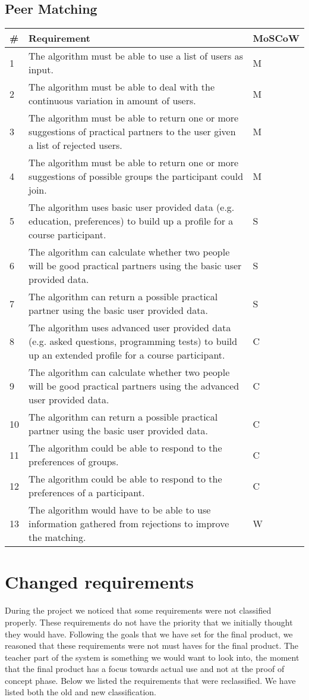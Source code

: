 \subsection{Peer Matching}
\begin{tabular}{ | p{0.5cm} | p{12cm} | p{2cm} | }
\hline
\textbf{\#} & \textbf{Requirement} & \textbf{MoSCoW} \\ \hline
1 & The algorithm must be able to use a list of users as input. & M \\ \hline
2 & The algorithm must be able to deal with the continuous variation in amount of users. & M \\ \hline
3 & The algorithm must be able to return one or more suggestions of practical partners to the user given a list of rejected users. & M \\ \hline
4 & The algorithm must be able to return one or more suggestions of possible groups the participant could join. & M \\ \hline
5 & The algorithm uses basic user provided data (e.g. education, preferences) to build up a profile for a course participant. & S \\ \hline
6 & The algorithm can calculate whether two people will be good practical partners using the basic user provided data. & S \\ \hline
7 & The algorithm can return a possible practical partner using the basic user provided data. & S \\ \hline
8 & The algorithm uses advanced user provided data (e.g. asked questions, programming tests) to build up an extended profile for a course participant. & C \\ \hline
9 & The algorithm can calculate whether two people will be good practical partners using the advanced user provided data. & C \\ \hline
10 & The algorithm can return a possible practical partner using the basic user provided data. & C \\ \hline
11 & The algorithm could be able to respond to the preferences of groups. & C \\ \hline
12 & The algorithm could be able to respond to the preferences of a participant. & C \\ \hline
13 & The algorithm would have to be able to use information gathered from rejections to improve the matching. & W \\
\hline
\end{tabular}

\section{Changed requirements}
During the project we noticed that some requirements were not classified properly.
These requirements do not have the priority that we initially thought they would have.
Following the goals that we have set for the final product, we reasoned that these requirements were not must haves for the final product.
The teacher part of the system is something we would want to look into, the moment that the final product has a focus towards actual use and not at the proof of concept phase.
Below we listed the requirements that were reclassified.
We have listed both the old and new classification.

